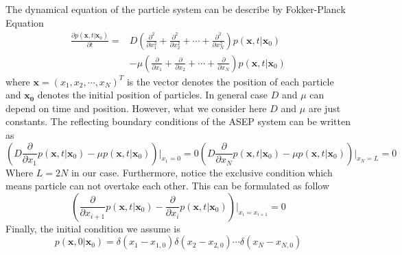 \documentclass[12pt,a4paper]{article}
\begin{document}
The dynamical equation of the particle system can be describe by Fokker-Planck
Equation 
\begin{equation}
\begin{aligned}
    \label{eq:fp}
    \frac{\partial p(\mathbf{x}, t | \mathbf{x}_0)}{\partial t} = & D \left(
        \frac{\partial^2}{\partial x_1^2} + \frac{\partial^2}{\partial x_2^2} +
        \cdots+\frac{\partial^2}{\partial x_N^2}\right)p(\mathbf{x},t|\mathbf{x}_0) \\ 
    & - \mu\left(\frac{\partial}{\partial x_1} +
        \frac{\partial}{\partial x_2} + \cdots + \frac{\partial}{\partial x_N}
    \right) p(\mathbf{x}, t | \mathbf{x}_0) 
\end{aligned}
\end{equation}
where $\mathbf{x}=(x_1, x_2, \cdots, x_N)^T$ is the vector denotes the position
of each particle and $\mathbf{x_0}$ denotes the initial position of particles.
In general case $D$ and $\mu$ can depend on time and position. However, what
we consider here $D$ and $\mu$ are just constants.
The reflecting boundary conditions of the ASEP system can be written as
\begin{subequations}
    \label{eq:reflecting_boundary}
    \begin{equation}
        \left(D\frac{\partial}{\partial x_1}p(\mathbf{x},t|\mathbf{x}_0) 
            -\mu p(\mathbf{x},t|\mathbf{x}_0)\right) \Bigg|_{x_1=0} = 0
    \end{equation}
    \begin{equation}
        \left(D\frac{\partial}{\partial x_N}p(\mathbf{x},t|\mathbf{x}_0) 
            -\mu p(\mathbf{x},t|\mathbf{x}_0)\right) \Bigg|_{x_N=L} = 0
    \end{equation}
\end{subequations}
Where $L=2N$ in our case. Furthermore, notice the exclusive condition which
means particle can not overtake each other. This can be formulated as follow
\begin{equation}
    \label{eq:exclusive_condition}
    \left(\frac{\partial}{\partial x_{i+1}}p(\mathbf{x},t|\mathbf{x}_0) -
        \frac{\partial}{\partial x_{i}} p(\mathbf{x},t|\mathbf{x}_0)
    \right)\Bigg|_{x_{i}=x_{i+1}} = 0 
\end{equation}
Finally, the initial condition we assume is
\begin{equation}
    \label{eq:initial_condition}
    p(\mathbf{x}, 0 | \mathbf{x}_0) =
    \delta(x_1-x_{1,0})\delta(x_2-x_{2,0})\cdots\delta(x_N-x_{N,0})
\end{equation}
\end{document}
